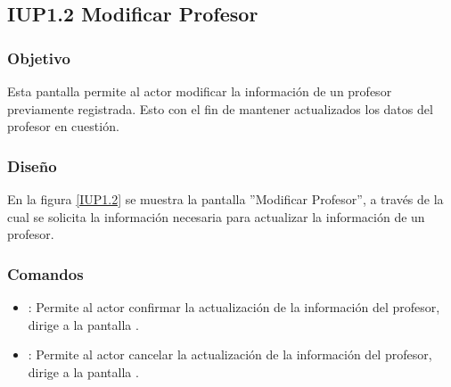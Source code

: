 \subsection{IUP1.2 Modificar Profesor}

\subsubsection{Objetivo}
	Esta pantalla permite al actor modificar la información de un profesor previamente registrada. Esto con el fin de mantener actualizados los datos del profesor en cuestión.

\subsubsection{Diseño}

	En la figura \ref{IUP1.2} se muestra la pantalla ''Modificar Profesor'', a través de la cual se solicita la información necesaria para actualizar la información de un profesor.


\subsubsection{Comandos}
\begin{itemize}
	\item {}: Permite al actor confirmar la actualización de la información del profesor, dirige a la pantalla .
	
	\item {}: Permite al actor cancelar la actualización de la información del profesor, dirige a la pantalla .
\end{itemize}
